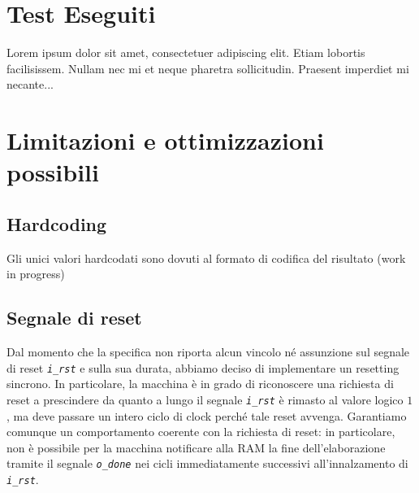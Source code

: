 \documentclass[12pt,a4paper,titlepage]{article}
\begin{document}
	\section{Test Eseguiti}
       
		Lorem ipsum dolor sit amet, consectetuer adipiscing elit.  
		Etiam lobortis facilisissem.  Nullam nec mi et neque pharetra 
		sollicitudin.  Praesent imperdiet mi necante...
	\section{Limitazioni e ottimizzazioni possibili}
		\subsection{Hardcoding}
			Gli unici valori hardcodati sono dovuti al formato di codifica del risultato (work in progress)
		\subsection{Segnale di reset}
			Dal momento che la specifica non riporta alcun vincolo né assunzione sul segnale di reset \textit{\texttt{i\_rst}} e sulla sua durata, abbiamo deciso di implementare un resetting sincrono. In particolare, la macchina è in grado di riconoscere una richiesta di reset a prescindere da quanto a lungo il segnale \textit{\texttt{i\_rst}} è rimasto al valore logico $1$, ma deve passare un intero ciclo di clock perché tale reset avvenga. Garantiamo comunque un comportamento coerente con la richiesta di reset: in particolare, non è possibile per la macchina notificare alla RAM la fine dell'elaborazione tramite il segnale \textit{\texttt{o\_done}} nei cicli immediatamente successivi all'innalzamento di \textit{\texttt{i\_rst}}.
\end{document}
